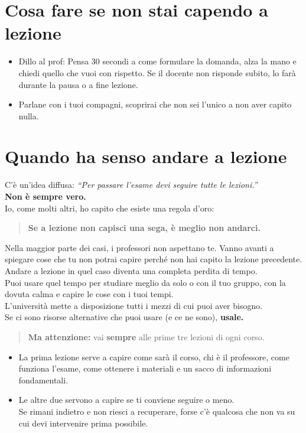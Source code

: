 \documentclass{article}
\begin{document}
\section{Cosa fare se non stai capendo a lezione}
\begin{itemize}
\item Dillo al prof: Pensa 30 secondi a come formulare la domanda, alza la mano e chiedi quello che vuoi con rispetto.  
  Se il docente non risponde subito, lo farà durante la pausa o a fine lezione.
\item Parlane con i tuoi compagni, scoprirai che non sei l'unico a non aver capito nulla.
\end{itemize}


\section{Quando ha senso andare a lezione}
C'è un'idea diffusa: \textit{``Per passare l'esame devi seguire tutte le lezioni.''}\\
\textbf{Non è sempre vero.}\\
Io, come molti altri, ho capito che esiste una regola d'oro:
\begin{quote}
\textbf{Se a lezione non capisci una sega, è meglio non andarci.}
\end{quote}
Nella maggior parte dei casi, i professori non aspettano te. Vanno avanti a spiegare cose che tu non potrai capire perché non hai capito la lezione precedente.\\
Andare a lezione in quel caso diventa una completa perdita di tempo.\\
Puoi usare quel tempo per studiare meglio da solo o con il tuo gruppo, con la dovuta calma e capire le cose con i tuoi tempi.\\
L'università mette a disposizione tutti i mezzi di cui puoi aver bisogno.\\
Se ci sono risorse alternative che puoi usare (e ce ne sono), \textbf{usale.}
\begin{quote}
\textbf{Ma attenzione:} vai \textbf{sempre} alle prime tre lezioni di ogni corso.
\end{quote}
\begin{itemize}
\item La prima lezione serve a capire come sarà il corso, chi è il professore, come funziona l'esame, come ottenere i materiali e un sacco di informazioni fondamentali.
\item Le altre due servono a capire se ti conviene seguire o meno.\\
   Se rimani indietro e non riesci a recuperare, forse c'è qualcosa che non va su cui devi intervenire prima possibile.
\end{itemize}
\end{document}
